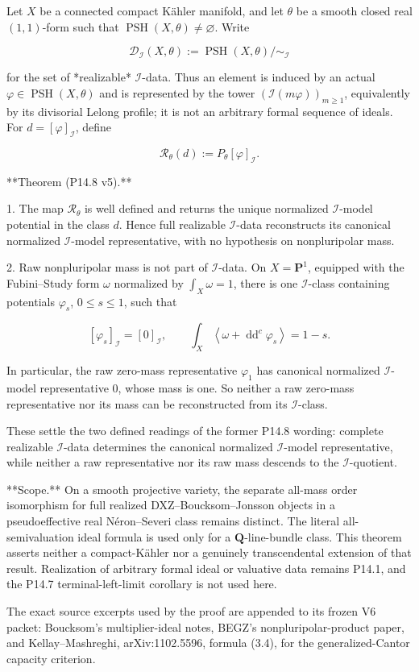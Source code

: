 Let $X$ be a connected compact Kähler manifold, and let $\theta$ be a smooth
closed real $(1,1)$-form such that $\operatorname{PSH}(X,\theta)\ne\varnothing$.
Write

$$
\mathscr D_{\mathcal I}(X,\theta)
:=\operatorname{PSH}(X,\theta)/{\sim_{\mathcal I}}
$$

for the set of *realizable* $\mathcal I$-data. Thus an element is induced by
an actual $\varphi\in\operatorname{PSH}(X,\theta)$ and is represented by the
tower $(\mathcal I(m\varphi))_{m\ge1}$, equivalently by its divisorial Lelong
profile; it is not an arbitrary formal sequence of ideals. For
$d=[\varphi]_{\mathcal I}$, define

$$
\mathcal R_\theta(d):=P_\theta[\varphi]_{\mathcal I}.
$$

**Theorem (P14.8 v5).**

1. The map $\mathcal R_\theta$ is well defined and returns the unique
   normalized $\mathcal I$-model potential in the class $d$. Hence full
   realizable $\mathcal I$-data reconstructs its canonical normalized
   $\mathcal I$-model representative, with no hypothesis on nonpluripolar
   mass.

2. Raw nonpluripolar mass is not part of $\mathcal I$-data. On
   $X=\mathbf P^1$, equipped with the Fubini--Study form $\omega$ normalized
   by $\int_X\omega=1$, there is one $\mathcal I$-class containing potentials
   $\varphi_s$, $0\le s\le1$, such that

   $$
   [\varphi_s]_{\mathcal I}=[0]_{\mathcal I},\qquad
   \int_X\left\langle\omega+\operatorname{dd}^c\varphi_s\right\rangle=1-s.
   $$

   In particular, the raw zero-mass representative $\varphi_1$ has canonical
   normalized $\mathcal I$-model representative $0$, whose mass is one. So
   neither a raw zero-mass representative nor its mass can be reconstructed
   from its $\mathcal I$-class.

These settle the two defined readings of the former P14.8 wording: complete
realizable $\mathcal I$-data determines the canonical normalized
$\mathcal I$-model representative, while neither a raw representative nor
its raw mass descends to the $\mathcal I$-quotient.

**Scope.** On a smooth projective variety, the separate all-mass order
isomorphism for full realized DXZ--Boucksom--Jonsson objects in a
pseudoeffective real Néron--Severi class remains distinct. The literal
all-semivaluation ideal formula is used only for a $\mathbf Q$-line-bundle
class. This theorem asserts neither a compact-Kähler nor a genuinely
transcendental extension of that result. Realization of arbitrary formal
ideal or valuative data remains P14.1, and the P14.7 terminal-left-limit
corollary is not used here.

The exact source excerpts used by the proof are appended to its frozen V6
packet: Boucksom's multiplier-ideal notes, BEGZ's nonpluripolar-product
paper, and Kellay--Mashreghi, arXiv:1102.5596, formula (3.4), for the
generalized-Cantor capacity criterion.

